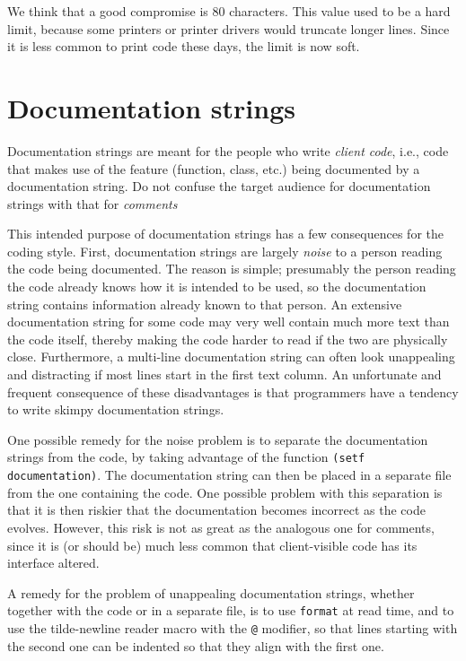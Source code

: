 We think that a good compromise is 80 characters.  This value used to
be a hard limit, because some printers or printer drivers would
truncate longer lines.  Since it is less common to print code these
days, the limit is now soft.

\section{Documentation strings}
\label{sec-general-coding-style-documentation-strings}

Documentation strings are meant for the people who write \emph{client
  code}, i.e., code that makes use of the feature (function, class,
etc.) being documented by a documentation string.  Do not confuse the
target audience for documentation strings with that for
\emph{comments} 

This intended purpose of documentation strings has a few consequences
for the coding style.  First, documentation strings are largely
\emph{noise} to a person reading the code being documented.  The
reason is simple; presumably the person reading the code already knows
how it is intended to be used, so the documentation string contains
information already known to that person.  An extensive documentation
string for some code may very well contain much more text than the
code itself, thereby making the code harder to read if the two are
physically close.  Furthermore, a multi-line documentation string can
often look unappealing and distracting if most lines start in the
first text column.  An unfortunate and frequent consequence of these
disadvantages is that programmers have a tendency to write skimpy
documentation strings.

One possible remedy for the noise problem is to separate the
documentation strings from the code, by taking advantage of the
function \texttt{(setf documentation)}.  The documentation string can
then be placed in a separate file from the one containing the code.
One possible problem with this separation is that it is then riskier
that the documentation becomes incorrect as the code evolves.
However, this risk is not as great as the analogous one for comments,
since it is (or should be) much less common that client-visible code
has its interface altered.

A remedy for the problem of unappealing documentation strings, whether
together with the code or in a separate file, is to use
\texttt{format} at read time, and to use the tilde-newline reader
macro with the \texttt{@} modifier, so that lines starting with the
second one can be indented so that they align with the first one.

